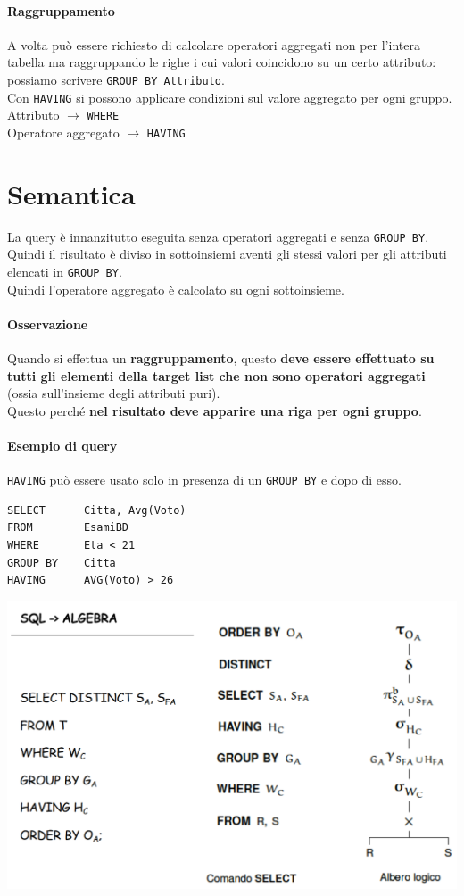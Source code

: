 \documentclass[10pt]{book}
\begin{document}
\paragraph{Raggruppamento} A volta può essere richiesto di calcolare operatori aggregati non per l'intera tabella ma raggruppando le righe i cui valori coincidono su un certo attributo: possiamo scrivere \texttt{GROUP BY Attributo}.\\
Con \texttt{HAVING} si possono applicare condizioni sul valore aggregato per ogni gruppo.\\
Attributo $\rightarrow$ \texttt{WHERE}\\
Operatore aggregato $\rightarrow$ \texttt{HAVING}
\section{Semantica}
La query è innanzitutto eseguita senza operatori aggregati e senza \texttt{GROUP BY}.\\
Quindi il risultato è diviso in sottoinsiemi aventi gli stessi valori per gli attributi elencati in \texttt{GROUP BY}.\\
Quindi l'operatore aggregato è calcolato su ogni sottoinsieme.
\paragraph{Osservazione} Quando si effettua un \textbf{raggruppamento}, questo \textbf{deve essere effettuato su tutti gli elementi della target list che non sono operatori aggregati} (ossia sull'insieme degli attributi puri).\\
Questo perché \textbf{nel risultato deve apparire una riga per ogni gruppo}.
\paragraph{Esempio di query} \texttt{HAVING} può essere usato solo in presenza di un \texttt{GROUP BY} e dopo di esso.
\begin{lstlisting}
SELECT		Citta, Avg(Voto)
FROM		EsamiBD
WHERE		Eta < 21
GROUP BY	Citta
HAVING		AVG(Voto) > 26
\end{lstlisting}
\begin{center}
	\includegraphics[scale=0.5]{sqlalg.png}
\end{center}
\end{document}
